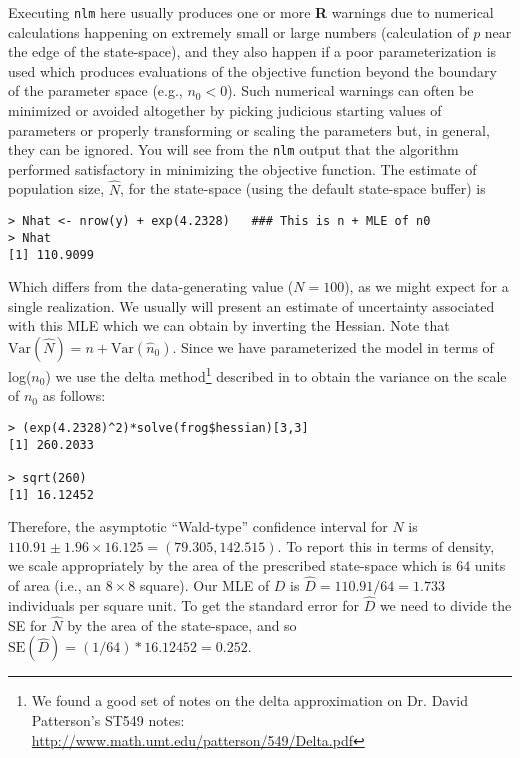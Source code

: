 Executing \mbox{\tt nlm} here
 usually produces one or more {\bf R} warnings due to numerical
calculations happening on extremely small or large numbers
(calculation of $p$ near the
edge of the state-space), and they also happen if a poor
parameterization is used which produces evaluations of the objective
function beyond the boundary of the parameter space (e.g., $n_{0} <
0$). Such numerical warnings can often be minimized or avoided
altogether by picking judicious starting values of parameters or
properly transforming or scaling the parameters but, in general, they
can be ignored.
You will see from the \mbox{\tt nlm} output that the
algorithm performed satisfactory in minimizing the objective function.
The estimate of population size, $\hat{N}$,  for the state-space (using the default 
state-space buffer) is
\begin{verbatim}
> Nhat <- nrow(y) + exp(4.2328)   ### This is n + MLE of n0
> Nhat
[1] 110.9099
\end{verbatim}
Which differs from the data-generating value ($N=100$), as we might
expect for a single realization. We usually will present an estimate of uncertainty associated
with this MLE which we can obtain by inverting the Hessian. Note that
$\mbox{Var}(\hat{N}) = n + \mbox{Var}(\hat{n}_{0})$.
Since we
have parameterized the model in terms of log($n_{0}$) we use the delta
method\footnote{
We found a good set of notes on the delta approximation on Dr. David
Patterson's ST549 notes: 
\url{http://www.math.umt.edu/patterson/549/Delta.pdf}
}
described in 
\citet[][Appendix F4]{williams_etal:2002}  \citep[see also][]{verhoef:2012}
 to obtain the variance on the scale of $n_{0}$ as
follows:
\begin{verbatim}
> (exp(4.2328)^2)*solve(frog$hessian)[3,3]
[1] 260.2033

> sqrt(260)
[1] 16.12452
\end{verbatim}
Therefore, the asymptotic ``Wald-type'' confidence interval for $N$ is
$110.91 \pm 1.96 \times 16.125 = (79.305, 142.515)$. To report this in
terms of density, we scale appropriately by the area of the prescribed
state-space which is $64$ units of area (i.e., an $8 \times 8$ square).
Our MLE of $D$ is $\hat{D} = 110.91/64  = 1.733$ individuals per
square unit. To get the standard error for $\hat{D}$ we need to divide
the SE for $\hat{N}$ by the area of the state-space, and so
$\mbox{SE}(\hat{D}) = (1/64)*16.12452 = 0.252$.





